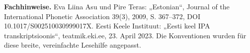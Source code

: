 \documentclass[a4paper,landscape,10pt]{article}
\begin{document}
\smallskip
\textbf{Fachhinweise.} Eva Liina Asu und Pire Teras: „Estonian“, Journal of the International
Phonetic Association 39(3), 2009, S. 367--372, DOI 10.1017/S002510030999017X.
Eesti Keele Instituut: „Eesti keel IPA transkriptsioonis“, teatmik.eki.ee, 23. April 2023.
Die Konventionen wurden für diese breite, vereinfachte Lesehilfe angepasst.
\end{document}
